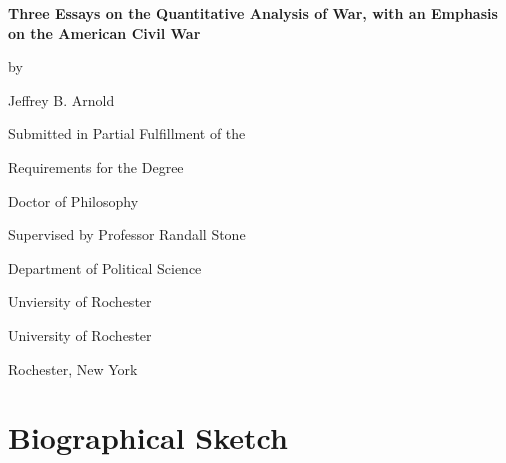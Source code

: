 \documentclass[12pt,oneside]{book}\usepackage[]{graphicx}\usepackage[]{color}
\newcommand{\myauthor}{Jeffrey B. Arnold}
\newcommand{\myinstitution}{University of Rochester}
\newcommand{\mylocation}{Rochester, New York}
\newcommand{\mytitle}{Three Essays on the Quantitative Analysis of War, with an Emphasis on the American Civil War}
\newcommand{\myadvisor}{Professor Randall Stone}
\newcommand{\myadvisorinstitution}{Unviersity of Rochester}
\newcommand{\myadvisordept}{Department of Political Science}
\newcommand{\myyear}{2016}
\begin{document}
\begin{titlepage}
  \vspace*{\fill}

  \begin{center}
    {\LARGE \bfseries \mytitle \par}

    \bigskip%
    by

    \bigskip%
    \myauthor


    \bigskip\bigskip\bigskip\bigskip%
    Submitted in Partial Fulfillment of the

    \bigskip%
    Requirements for the Degree

    \bigskip%
    Doctor of Philosophy


    \bigskip\bigskip\bigskip\bigskip%
    Supervised by \myadvisor{}

    \bigskip\bigskip%
    \myadvisordept{}

    \bigskip%
    \myadvisorinstitution{}


    \bigskip\bigskip\bigskip\bigskip%
    \myinstitution

    \bigskip%
    \mylocation{}


    \bigskip\bigskip\bigskip\bigskip%
    \myyear{}
  \end{center}

  \vspace*{\fill}
\end{titlepage}



\pagestyle{fancy}
\setcounter{page}{2}
\doublespacing


%   

\clearpage


\chapter*{Biographical Sketch}

\end{document}
